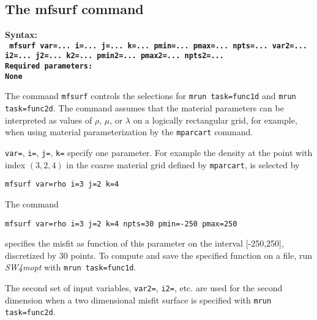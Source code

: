 \documentclass[12pt]{report}
\begin{document}
\subsection{The mfsurf command}\label{sec:nlcg}
\begin{flushleft}\bf
Syntax:\\
\tt
mfsurf var=... i=... j=... k=... pmin=... pmax=... npts=... var2=... i2=... j2=... k2=... pmin2=... pmax2=... npts2=...
\\
\bf Required parameters:\\
\rm
None
\end{flushleft}
The command \verb+mfsurf+ controls the selections for {\tt mrun task=func1d} and {\tt mrun task=func2d}.
The command assumes that the material parameters can be interpreted as values of
$\rho$, $\mu$, or $\lambda$ on a logically rectangular grid, for example, when using material
parameterization by the \verb+mparcart+ command.\par
\verb+var=+, \verb+i=+, \verb+j=+, \verb+k=+ specify one parameter. For example the density at the
point with index $(3,2,4)$ in the coarse material grid defined by \verb+mparcart+, is selected by
\begin{verbatim}
mfsurf var=rho i=3 j=2 k=4
\end{verbatim}
The command 
\begin{verbatim}
mfsurf var=rho i=3 j=2 k=4 npts=30 pmin=-250 pmax=250
\end{verbatim}
specifies the misfit as function of this parameter on the interval [-250,250], discretized by 30 points.
To compute and save the specified function on a file, run \emph{SW4mopt} with \verb+mrun task=func1d+.
\par
The second set of input variables, \verb+var2=+, \verb+i2=+, etc. are used for the second dimension when
a two dimensional misfit surface is specified with \verb+mrun task=func2d+.
\end{document}
